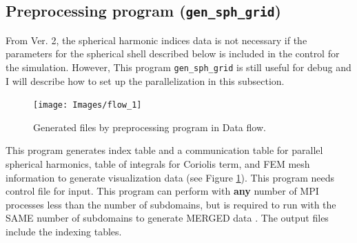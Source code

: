 \subsection{Preprocessing program ({\tt gen\_sph\_grid})}
\label{section:gen_sph_grid}
%
From Ver. 2, the spherical harmonic indices data is not necessary if the parameters for the spherical shell described below is included in the control for the simulation. However, This program \verb|gen_sph_grid| is still useful for debug and I will describe how to set up the parallelization in this subsection.
%
\begin{figure}[htbp]
\begin{center}
\texttt{[image: Images/flow\_1]}
\end{center}
\caption{Generated files by preprocessing program in Data flow.}
\label{fig:gen_sph_grid}
\end{figure}
%
This program generates index table and a communication table for parallel spherical harmonics, table of integrals for Coriolis term, and FEM mesh information to generate visualization data (see Figure \ref{fig:gen_sph_grid}). This program needs control file for input. This program can perform with {\bf any} number of MPI processes less than the number of subdomains, but is required to run with the SAME number of subdomains to generate MERGED data . The output files include the indexing tables. 

